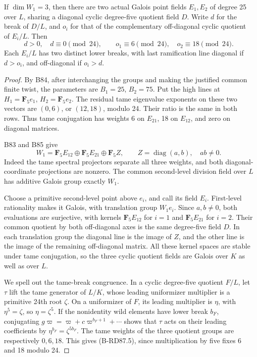 \begin{lemma}
\label{lem:B-RD87-fields}
If \(\dim W_1=3\), then there are two actual Galois
point fields \(E_1,E_2\) of degree 25 over \(L\),
sharing a diagonal cyclic degree-five quotient field
\(D\). Write \(d\) for the break of \(D/L\), and
\(o_i\) for that of the complementary off-diagonal
cyclic quotient of \(E_i/L\). Then
\[
     d>0,\quad d\equiv0\pmod{24},\qquad
        o_1\equiv6\pmod{24},\quad o_2\equiv18\pmod{24}.
                                                        \tag{B-RD87.5}
\]
Each \(E_i/L\) has two distinct lower breaks, with
last ramification line diagonal if \(d>o_i\), and
off-diagonal if \(o_i>d\).
\end{lemma}
\begin{proof}
By B84, after interchanging the groups and making
the justified common finite twist, the parameters
are \(B_1=25\), \(B_2=75\). Put the high lines at
\(H_1=\mathbf F_5e_1\), \(H_2=\mathbf F_5e_2\).
The residual tame eigenvalue exponents on these
two vectors are \((0,6)\), or \((12,18)\),
modulo 24. Their ratio is the same in both rows.
Thus tame conjugation has weights 6 on \(E_{21}\),
18 on \(E_{12}\), and zero on diagonal matrices.

B83 and B85 give
\[
 W_1=\mathbf F_5E_{12}\oplus\mathbf F_5E_{21}
                    \oplus\mathbf F_5Z,
             \qquad Z=\operatorname{diag}(a,b),\quad ab\ne0.
                                                        \tag{B-RD87.6}
\]
Indeed the tame spectral projectors separate all
three weights, and both diagonal-coordinate
projections are nonzero. The common second-level
division field over \(L\) has additive Galois group
exactly \(W_1\).

Choose a primitive second-level point above \(e_i\),
and call its field \(E_i\). First-level rationality
makes it Galois, with translation group \(W_1e_i\).
Since \(a,b\ne0\), both evaluations are surjective,
with kernels \(\mathbf F_5E_{12}\) for \(i=1\)
and \(\mathbf F_5E_{21}\) for \(i=2\).
Their common quotient by both off-diagonal axes
is the same degree-five field \(D\). In each
translation group the diagonal line is the image
of \(Z\), and the other line is the image of the
remaining off-diagonal matrix. All these kernel
spaces are stable under tame conjugation, so the
three cyclic quotient fields are Galois over \(K\)
as well as over \(L\).

We spell out the tame-break congruence. In a cyclic
degree-five quotient \(F/L\), let \(\tau\) lift
the tame generator of \(L/K\), whose leading
uniformizer multiplier is a primitive 24th root
\(\zeta\). On a uniformizer of \(F\), its leading
multiplier is \(\eta\), with \(\eta^5=\zeta\),
so \(\eta=\zeta^5\). If the nonidentity wild
elements have lower break \(b_F\), conjugating
\(g\varpi=\varpi+c\varpi^{b_F+1}+\cdots\)
shows that \(\tau\) acts on their leading
coefficients by \(\eta^{b_F}=\zeta^{5b_F}\).
The tame weights of the three quotient groups
are respectively \(0,6,18\). This gives
(B-RD87.5), since multiplication by five fixes
6 and 18 modulo 24.


\end{proof}
